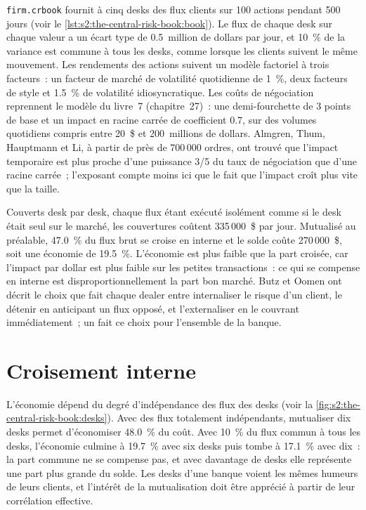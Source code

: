 \texttt{firm.crbook} fournit à cinq desks des flux clients sur 100 actions pendant 500 jours (voir le \cref{lst:s2:the-central-risk-book:book}). Le flux de chaque desk sur chaque valeur
a un écart type de 0.5~million de dollars par jour, et 10~\% de la variance est commune à tous les desks, comme lorsque les clients suivent le même mouvement. Les rendements des actions suivent un
modèle factoriel à trois facteurs~: un facteur de marché de volatilité quotidienne de 1~\%, deux facteurs de style et 1.5~\% de volatilité idiosyncratique. Les coûts de négociation reprennent le modèle du livre~7
(chapitre~27)~: une demi-fourchette de 3 points de base et un impact en racine carrée de coefficient 0.7, sur des volumes quotidiens compris entre 20~\$ et 200~millions de dollars.
Almgren, Thum, Hauptmann et Li, à partir de près de 700\,000 ordres, ont trouvé que l'impact temporaire est plus proche d'une puissance 3/5 du taux de négociation que d'une racine carrée~;
l'exposant compte moins ici que le fait que l'impact croît plus vite que la taille.

Couverts desk par desk, chaque flux étant exécuté isolément comme si le desk était seul sur le marché, les couvertures coûtent 335\,000~\$ par jour. Mutualisé au préalable, 47.0~\% du
flux brut se croise en interne et le solde coûte 270\,000~\$, soit une économie de 19.5~\%. L'économie est plus faible que la part croisée, car l'impact par
dollar est plus faible sur les petites transactions~: ce qui se compense en interne est disproportionnellement la part bon marché. Butz et Oomen ont décrit le choix que fait chaque dealer entre
internaliser le risque d'un client, le détenir en anticipant un flux opposé, et l'externaliser en le couvrant immédiatement~; un  fait
ce choix pour l'ensemble de la banque.

\section{Croisement interne}

L'économie dépend du degré d'indépendance des flux des desks (voir la \cref{fig:s2:the-central-risk-book:desks}). Avec des flux totalement indépendants, mutualiser dix desks
permet d'économiser 48.0~\% du coût. Avec 10~\% du flux commun à tous les desks, l'économie culmine à 19.7~\% avec six desks puis tombe à 17.1~\% avec dix~: la
part commune ne se compense pas, et avec davantage de desks elle représente une part plus grande du solde. Les desks d'une banque voient les mêmes humeurs de leurs clients, et l'intérêt de la mutualisation doit
être apprécié à partir de leur corrélation effective.

